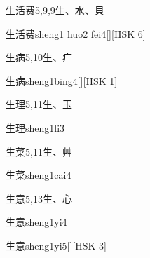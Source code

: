 \begin{Entry}{生活费}{5,9,9}{⽣、⽔、⾙}
  \begin{Phonetics}{生活费}{sheng1 huo2 fei4}[][HSK 6]
  \end{Phonetics}
\end{Entry}

\begin{Entry}{生病}{5,10}{⽣、⽧}
  \begin{Phonetics}{生病}{sheng1bing4}[][HSK 1]
  \end{Phonetics}
\end{Entry}

\begin{Entry}{生理}{5,11}{⽣、⽟}
  \begin{Phonetics}{生理}{sheng1li3}
  \end{Phonetics}
\end{Entry}

\begin{Entry}{生菜}{5,11}{⽣、⾋}
  \begin{Phonetics}{生菜}{sheng1cai4}
  \end{Phonetics}
\end{Entry}

\begin{Entry}{生意}{5,13}{⽣、⼼}
  \begin{Phonetics}{生意}{sheng1yi4}
  \end{Phonetics}
  \begin{Phonetics}{生意}{sheng1yi5}[][HSK 3]
  \end{Phonetics}
\end{Entry}


